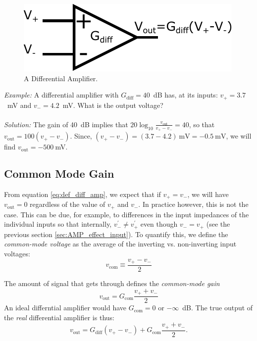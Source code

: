\documentclass[]{article}
\begin{document}
\begin{figure}[ht]
\caption{A Differential Amplifier.}
\label{fig:differential_amplifier}
\begin{center}
\includegraphics[]{Images/differential_amplifier.pdf}
\end{center}
\end{figure}


\textit{Example:} A differential amplifier with $G_\text{diff} = 40$~dB has, at its inputs: $v_+ = 3.7$~mV and $v_- = 4.2$~mV. What is the output voltage?\\\\
\textit{Solution:} The gain of 40~dB implies that $20\log_{10}\frac{v_\text{out}}{v_+-v_-} = 40$, so that $v_\text{out} = 100\left(v_+-v_-\right)$. Since, $\left(v_+-v_-\right) = \left(3.7-4.2\right)~\text{mV} = -0.5~\text{mV}$, we will find $v_\text{out} = -500~$mV.
\subsection{Common Mode Gain}
From equation \ref{eq:def_diff_amp}, we expect that if $v_+ = v_-$, we will have $v_\text{out} = 0$ regardless of the value of $v_+$ and $v_-$. In practice however, this is not the case. This can be due, for example, to differences in the input impedances of the individual inputs so that internally, $v_-^\prime \neq v_+^\prime$ even though $v_- = v_+$ (see the previous section \ref{sec:AMP_effect_input}). To quantify this, we define the \textit{common-mode voltage} as the average of the inverting vs. non-inverting input voltages:
\begin{equation}
\label{eq:common_mode_voltage}
v_\text{com} \equiv \frac{v_+-v_-}{2}
\end{equation}

The amount of signal that gets through defines the \textit{common-mode gain}
\begin{equation}
\label{eq:common_mode_gain}
v_\text{out} = G_\text{com}\frac{v_++v_-}{2}
\end{equation}
An ideal differntial amplifier would have $G_\text{com} = 0$ or $-\infty$~dB. The true output of the \textit{real} differential amplifier is thus:
\begin{equation}
\label{eq:real_diff_amp}
v_\text{out} = G_\text{diff}\left(v_+-v_-\right) + G_\text{com}\frac{v_++v_-}{2}.
\end{equation}
\end{document}
